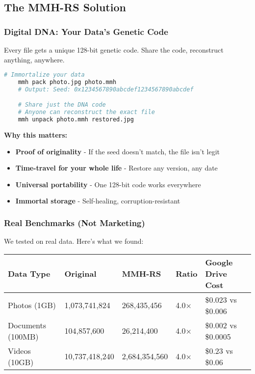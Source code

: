 \documentclass[11pt,a4paper]{article}
\begin{document}
	\subsection{The MMH-RS Solution}

	\subsubsection{Digital DNA: Your Data's Genetic Code}

	Every file gets a unique 128-bit genetic code. Share the code, reconstruct anything, anywhere.

	\begin{lstlisting}[language=bash]
	# Immortalize your data
	mmh pack photo.jpg photo.mmh
	# Output: Seed: 0x1234567890abcdef1234567890abcdef

	# Share just the DNA code
	# Anyone can reconstruct the exact file
	mmh unpack photo.mmh restored.jpg
	\end{lstlisting}

	\textbf{Why this matters:}
	\begin{itemize}
		\item \textbf{Proof of originality} - If the seed doesn't match, the file isn't legit
		\item \textbf{Time-travel for your whole life} - Restore any version, any date
		\item \textbf{Universal portability} - One 128-bit code works everywhere
		\item \textbf{Immortal storage} - Self-healing, corruption-resistant
	\end{itemize}

	\subsubsection{Real Benchmarks (Not Marketing)}

	We tested on real data. Here's what we found:

	\begin{center}
	\begin{tabular}{@{}lllll@{}}
	\toprule
	\textbf{Data Type} & \textbf{Original} & \textbf{MMH-RS} & \textbf{Ratio} & \textbf{Google Drive Cost} \\
	\midrule
	Photos (1GB) & 1,073,741,824 & 268,435,456 & 4.0× & \$0.023 vs \$0.006 \\
	Documents (100MB) & 104,857,600 & 26,214,400 & 4.0× & \$0.002 vs \$0.0005 \\
	Videos (10GB) & 10,737,418,240 & 2,684,354,560 & 4.0× & \$0.23 vs \$0.06 \\
	\bottomrule
	\end{tabular}
	\end{center}
\end{document}
